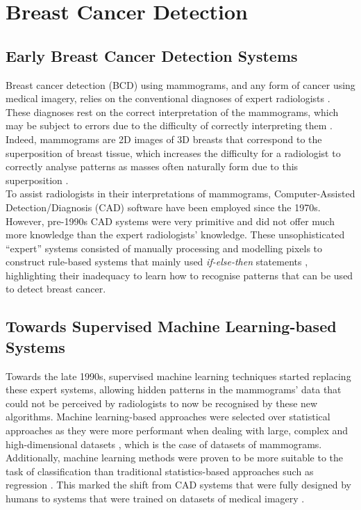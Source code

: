 
\section{Breast Cancer Detection}

\subsection{Early Breast Cancer Detection Systems}


Breast cancer detection (BCD) using mammograms, and any form of cancer using medical imagery, relies on the conventional diagnoses of expert radiologists \cite{Osareh2010}. These diagnoses rest on the correct interpretation of the mammograms, which may be subject to errors due to the difficulty of correctly interpreting them \cite{Elter2009}. Indeed, mammograms are 2D images of 3D breasts that correspond to the superposition of breast tissue, which increases the difficulty for a radiologist to correctly analyse patterns as masses often naturally form due to this superposition \cite{Elter2009}.\\

To assist radiologists in their interpretations of mammograms, Computer-Assisted Detection/Diagnosis (CAD) software have been employed since the 1970s. However, pre-1990s CAD systems were very primitive and did not offer much more knowledge than the expert radiologists' knowledge. These unsophisticated ``expert'' systems consisted of manually processing and modelling pixels to construct rule-based systems that mainly used \textit{if-else-then} statements \cite{Litjens2017}, highlighting their inadequacy to learn how to recognise patterns that can be used to detect breast cancer.

\subsection{Towards Supervised Machine Learning-based Systems}

Towards the late 1990s, supervised machine learning techniques started replacing these expert systems, allowing hidden patterns in the mammograms' data that could not be perceived by radiologists to now be recognised by these new algorithms. Machine learning-based approaches were selected over statistical approaches as they were more performant when dealing with large, complex and high-dimensional datasets \cite{Yue2018}, which is the case of datasets of mammograms. Additionally, machine learning methods were proven to be more suitable to the task of classification than traditional statistics-based approaches such as regression \cite{Paliwal2009}. This marked the shift from CAD systems that were fully designed by humans to systems that were trained on datasets of medical imagery \cite{Litjens2017}.\\

